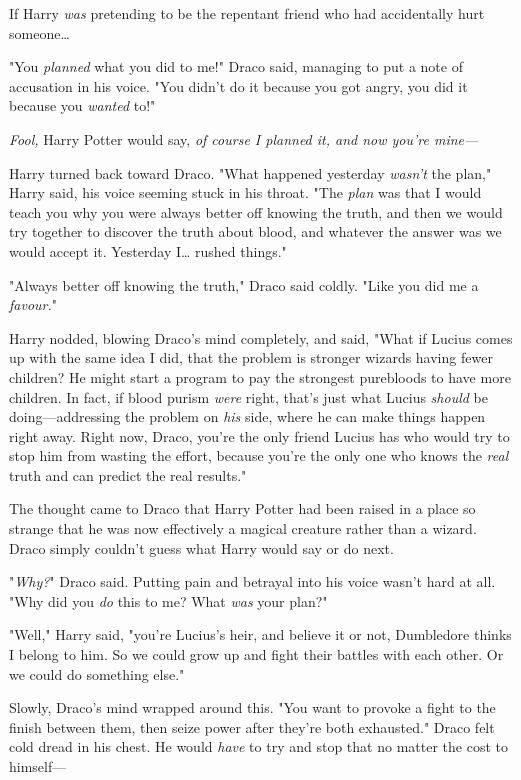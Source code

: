 If Harry \emph{was} pretending to be the repentant friend who had accidentally
hurt someone{\ldots}

"You \emph{planned} what you did to me!" Draco said, managing to put a note of
accusation in his voice. "You didn't do it because you got angry, you did it
because you \emph{wanted} to!"

\emph{Fool,} Harry Potter would say, \emph{of course I planned it, and now
you're mine---}

Harry turned back toward Draco. "What happened yesterday \emph{wasn't} the
plan," Harry said, his voice seeming stuck in his throat. "The \emph{plan} was
that I would teach you why you were always better off knowing the truth, and
then we would try together to discover the truth about blood, and whatever the
answer was we would accept it. Yesterday I{\ldots} rushed things."

"Always better off knowing the truth," Draco said coldly. "Like you did me a
\emph{favour.}"

Harry nodded, blowing Draco's mind completely, and said, "What if Lucius comes
up with the same idea I did, that the problem is stronger wizards having fewer
children? He might start a program to pay the strongest purebloods to have more
children. In fact, if blood purism \emph{were} right, that's just what Lucius
\emph{should} be doing---addressing the problem on \emph{his} side, where he
can make things happen right away. Right now, Draco, you're the only friend
Lucius has who would try to stop him from wasting the effort, because you're
the only one who knows the \emph{real} truth and can predict the real results."

The thought came to Draco that Harry Potter had been raised in a place so
strange that he was now effectively a magical creature rather than a wizard.
Draco simply couldn't guess what Harry would say or do next.

"\emph{Why?}" Draco said. Putting pain and betrayal into his voice wasn't hard
at all. "Why did you \emph{do} this to me? What \emph{was} your plan?"

"Well," Harry said, "you're Lucius's heir, and believe it or not, Dumbledore
thinks I belong to him. So we could grow up and fight their battles with each
other. Or we could do something else."

Slowly, Draco's mind wrapped around this. "You want to provoke a fight to the
finish between them, then seize power after they're both exhausted." Draco felt
cold dread in his chest. He would \emph{have} to try and stop that no matter
the cost to himself---

